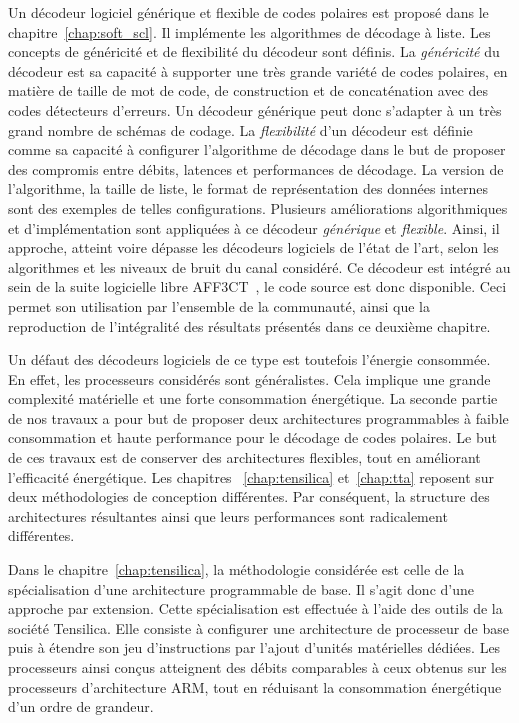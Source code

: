 Un décodeur logiciel générique et flexible de codes polaires est proposé dans le chapitre~\ref{chap:soft_scl}. Il implémente les algorithmes de décodage à liste. Les concepts de généricité et de flexibilité du décodeur sont définis. La \textit{généricité} du décodeur est sa capacité à supporter une très grande variété de codes polaires, en matière de taille de mot de code, de construction et de concaténation avec des codes détecteurs d'erreurs. Un décodeur générique peut donc s'adapter à un très grand nombre de schémas de codage. La \textit{flexibilité} d'un décodeur est définie comme sa capacité à configurer l'algorithme de décodage dans le but de proposer des compromis entre débits, latences et performances de décodage. La version de l'algorithme, la taille de liste, le format de représentation des données internes sont des exemples de telles configurations. Plusieurs améliorations algorithmiques et d'implémentation sont appliquées à ce décodeur \textit{générique} et \textit{flexible}. Ainsi, il approche, atteint voire dépasse les décodeurs logiciels de l'état de l'art, selon les algorithmes et les niveaux de bruit du canal considéré. Ce décodeur est intégré au sein de la suite logicielle libre AFF3CT~, le code source est donc disponible. Ceci permet son utilisation par l'ensemble de la communauté, ainsi que la reproduction de l'intégralité des résultats présentés dans ce deuxième chapitre.

Un défaut des décodeurs logiciels de ce type est toutefois l'énergie consommée. En effet, les processeurs considérés sont généralistes. Cela implique une grande complexité matérielle et une forte consommation énergétique. La seconde partie de nos travaux a pour but de proposer deux architectures programmables à faible consommation et haute performance pour le décodage de codes polaires. Le but de ces travaux est de conserver des architectures flexibles, tout en améliorant l'efficacité énergétique. Les chapitres ~\ref{chap:tensilica} et~\ref{chap:tta} reposent sur deux méthodologies de conception différentes. Par conséquent, la structure des architectures résultantes ainsi que leurs performances sont radicalement différentes.

Dans le chapitre~\ref{chap:tensilica}, la méthodologie considérée est celle de la spécialisation d'une architecture programmable de base. Il s'agit donc d'une approche par extension. Cette spécialisation est effectuée à l'aide des outils de la société Tensilica. Elle consiste à configurer une architecture de processeur de base puis à étendre son jeu d'instructions par l'ajout d'unités matérielles dédiées. Les processeurs ainsi conçus atteignent des débits comparables à ceux obtenus sur les processeurs d'architecture ARM, tout en réduisant la consommation énergétique d'un ordre de grandeur. 

